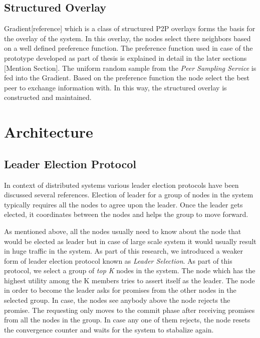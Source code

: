 \documentclass[12pt,a4paper,twoside,openright]{book}
\begin{document}
\subsection{Structured Overlay}

Gradient[reference] which is a class of structured P2P overlays forms the basis for the overlay of the system. In this overlay, the nodes select there neighbors based on a well defined preference function. The preference function used in case of the prototype developed as part of thesis is explained in detail in the later sections [Mention Section]. The uniform random sample from the \textit{Peer Sampling Service} is fed into the Gradient. Based on the preference function the node select the best peer to exchange information with. In this way, the structured overlay is constructed and maintained.


\section{Architecture}

\subsection{Leader Election Protocol}

In context of distributed systems various leader election protocols have been discussed {several references}. Election of leader for a group of nodes in the system typically requires all the nodes to agree upon the leader. Once the leader gets elected, it coordinates between the nodes and helps the group to move forward. 
\par As mentioned above, all the nodes usually need to know about the node that would be elected as leader but in case of large scale system it would usually result in huge traffic in the system. As part of this research, we introduced a weaker form of leader election protocol known as \textit{Leader Selection}. As part of this protocol, we select a group of \textit{top K} nodes in the system. The node which has the highest utility among the K members tries to assert itself as the leader. The node in order to become the leader asks for promises from the other nodes in the selected group. In case, the nodes see anybody above the node rejects the promise. The requesting only moves to the commit phase after receiving promises from all the nodes in the group. In case any one of them rejects, the node resets the convergence counter and waits for the system to stabalize again. 
\end{document}

